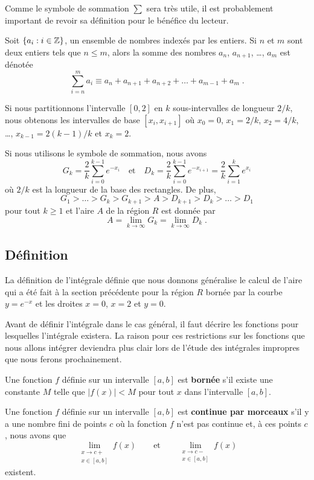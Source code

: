{Comme le symbole de sommation $\displaystyle \sum$ sera très utile, il
est probablement important de revoir sa définition pour le bénéfice du
lecteur.

\begin{focus}{\dfn}
Soit $\{ a_i : i \in \mathbb{Z} \}$, un ensemble de nombres indexés par les
entiers.  Si $n$ et $m$ sont deux entiers tels que $n\leq m$, alors la
somme des nombres $a_n$, $a_{n+1}$, \ldots, $a_m$ est dénotée
\[
\sum_{i=n}^m a_i \equiv a_n + a_{n+1} + a_{n+2} + \ldots + a_{m-1} + a_m \; .
\]
\end{focus}

Si nous partitionnons l'intervalle $[0,2]$ en $k$ sous-intervalles de
longueur $2/k$, nous obtenons les intervalles de base $[x_i,x_{i+1}]$ où
$x_0=0$, $x_1=2/k$, $x_2=4/k$, \ldots, $x_{k-1} = 2(k-1)/k$ et
$x_k= 2$. 

Si nous utilisons le symbole de sommation, nous avons
\[
G_k = \frac{2}{k} \sum_{i=0}^{k-1} e^{-x_i}
\quad \text{et} \quad
D_k = \frac{2}{k} \sum_{i=0}^{k-1} e^{-x_{i+1}}
= \frac{2}{k} \sum_{i=1}^{k} e^{x_i}
\]
où $2/k$ est la longueur de la base des rectangles.  De plus,
\[
G_1 > \ldots > G_{k} > G_{k+1} > A > D_{k+1} > D_{k} > \ldots > D_1
\]
pour tout $k\geq 1$ et l'aire $A$ de la région $R$ est donnée par
\[
A= \lim_{k\rightarrow \infty} G_k = \lim_{k\rightarrow \infty} D_k \; .
\]

\subsection{Définition}

La définition de l'intégrale définie que nous donnons généralise le
calcul de l'aire qui a été fait à la section précédente pour la région
$R$ bornée par la courbe $y=e^{-x}$ et les droites $x=0$, $x=2$ et
$y=0$.

Avant de définir l'intégrale dans le cas général, il faut décrire
les fonctions pour lesquelles l'intégrale existera.  La raison pour
ces restrictions sur les fonctions que nous allons intégrer deviendra
plus clair lors de l'étude des intégrales impropres que nous ferons
prochainement.

\begin{focus}{\dfn}
Une fonction $f$ définie sur un intervalle $[a,b]$ est
{\bfseries bornée} s'il existe une constante
$M$ telle que $|f(x)|<M$ pour tout $x$ dans l'intervalle $[a,b]$.

Une fonction $f$ définie sur un intervalle $[a,b]$ est
{\bfseries continue par morceaux} s'il y a une nombre fini de points $c$ où la fonction $f$
n'est pas continue et, à ces points $c$, nous avons que
\[
\lim_{\substack{x\rightarrow c+\\ x\in[a,b]}} f(x)
\qquad \text{et} \qquad
\lim_{\substack{x\rightarrow c-\\ x\in[a,b]}} f(x)
\]
existent.
\end{focus}

}
